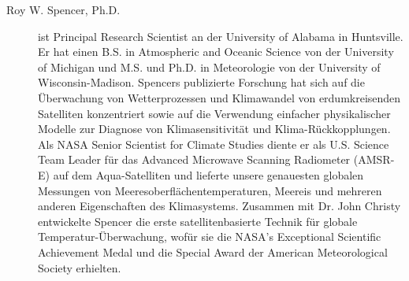 \documentclass[12pt,paper=a4,DIV=12,parskip=never,chapterprefix=false,headings=standardclasses]{scrreprt}
\begin{document}
\begin{description}
  \item[Roy W. Spencer, Ph.D.] ist Principal Research Scientist an der University of Alabama in Huntsville. Er hat einen B.S. in Atmospheric and Oceanic Science von der University of Michigan und M.S. und Ph.D. in Meteorologie von der University of Wisconsin-Madison. Spencers publizierte Forschung hat sich auf die Überwachung von Wetterprozessen und Klimawandel von erdumkreisenden Satelliten konzentriert sowie auf die Verwendung einfacher physikalischer Modelle zur Diagnose von Klimasensitivität und Klima-Rückkopplungen. Als NASA Senior Scientist for Climate Studies diente er als U.S. Science Team Leader für das Advanced Microwave Scanning Radiometer (AMSR-E) auf dem Aqua-Satelliten und lieferte unsere genauesten globalen Messungen von Meeresoberflächentemperaturen, Meereis und mehreren anderen Eigenschaften des Klimasystems. Zusammen mit Dr. John Christy entwickelte Spencer die erste satellitenbasierte Technik für globale Temperatur-Überwachung, wofür sie die NASA's Exceptional Scientific Achievement Medal und die Special Award der American Meteorological Society erhielten.
\end{description}
\end{document}
